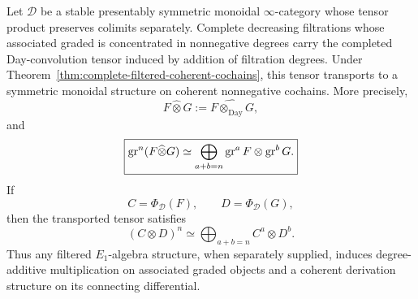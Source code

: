 \begin{proposition}
\label{prop:monoidal-complete-filtration-correspondence}
Let \(\mathcal D\) be a stable presentably symmetric monoidal \(\infty\)-category whose tensor
product preserves colimits separately.  Complete decreasing filtrations whose associated graded is
concentrated in nonnegative degrees carry the completed Day-convolution tensor induced by addition of
filtration degrees.  Under Theorem~\ref{thm:complete-filtered-coherent-cochains}, this tensor
transports to a symmetric monoidal structure on coherent nonnegative cochains.  More precisely,
\[
\boxed{
    F\widehat\otimes G
    :=
    \widehat{F\otimes_{\mathrm{Day}}G},
}
\]
and
\[
\boxed{
    \operatorname{gr}^n(F\widehat\otimes G)
    \simeq
    \bigoplus_{a+b=n}
    \operatorname{gr}^aF\otimes\operatorname{gr}^bG.
}
\]
If
\[
    C=\Phi_{\mathcal D}(F),
    \qquad
    D=\Phi_{\mathcal D}(G),
\]
then the transported tensor satisfies
\[
\boxed{
    (C\otimes D)^n
    \simeq
    \bigoplus_{a+b=n}C^a\otimes D^b.
}
\]
Thus any filtered \(E_1\)-algebra structure, when separately supplied, induces degree-additive
multiplication on associated graded objects and a coherent derivation structure on its connecting
differential.
\end{proposition}


